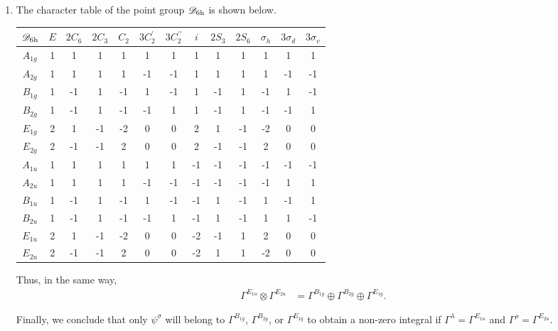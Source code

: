 \documentclass[a4paper]{book}
\begin{document}
\begin{solution}
\begin{enumerate}[label=(\alph*)]
		\item The character table of the point group $\mathscr{D}_{\rm 6h}$ is shown below.
		\begin{center}
		\begin{tabular}{ccccccccccccc}\hline
	$\mathscr{D}_{\rm 6h}$ & $E$ & $2C_6$ & $2C_3$ & $C_2$ & $3C^\prime_2 $ & $3C^{\prime\prime}_2$ & $i$ & $2S_3$ & $2S_6$ & $\sigma_h$ & $3\sigma_d$ & $3\sigma_v$ \\ \hline
			$A_{1g}$ & 1 & 1 & 1 & 1 & 1 & 1 & 1 & 1 & 1 & 1 & 1 & 1 \\
			$A_{2g}$ & 1 & 1 & 1 & 1 & -1 & -1 & 1 & 1 & 1 & 1 & -1 & -1 \\
			$B_{1g}$ & 1 & -1 & 1 & -1 & 1 & -1 & 1 & -1 & 1 & -1 & 1 & -1 \\
			$B_{2g}$ & 1 & -1 & 1 & -1 & -1 & 1 & 1 & -1 & 1 & -1 & -1 & 1 \\
			$E_{1g}$ & 2 & 1 & -1 & -2 & 0 & 0 & 2 & 1 & -1 & -2 & 0 & 0 \\
			$E_{2g}$ & 2 & -1 & -1 & 2 & 0 & 0 & 2 & -1 & -1 & 2 & 0 & 0 \\
			$A_{1u}$ & 1 & 1 & 1 & 1 & 1 & 1 & -1 & -1 & -1 & -1 & -1 & -1 \\
			$A_{2u}$ & 1 & 1 & 1 & 1 & -1 & -1 & -1 & -1 & -1 & -1 & 1 & 1 \\
			$B_{1u}$ & 1 & -1 & 1 & -1 & 1 & -1 & -1 & 1 & -1 & 1 & -1 & 1 \\
			$B_{2u}$ & 1 & -1 & 1 & -1 & -1 & 1 & -1 & 1 & -1 & 1 & 1 & -1 \\
			$E_{1u}$ & 2 & 1 & -1 & -2 & 0 & 0 & -2 & -1 & 1 & 2 & 0 & 0 \\
			$E_{2u}$ & 2 & -1 & -1 & 2 & 0 & 0 & -2 & 1 & 1 & -2 & 0 & 0 \\ \hline
		\end{tabular}
		\end{center}
		Thus, in the same way,
		\begin{align}
			\Gamma^{E_{1u}} \otimes \Gamma^{E_{2u}} &= \Gamma^{B_{1g}} \oplus \Gamma^{B_{2g}} \oplus \Gamma^{E_{1g}}.
		\end{align}
		
		Finally, we conclude that only $\psi^\sigma$ will belong to $\Gamma^{B_{1g}}$, $\Gamma^{B_{2g}}$, or $\Gamma^{E_{1g}}$ to obtain a non-zero integral if $\Gamma^\lambda = \Gamma^{E_{1u}}$ and $\Gamma^\rho = \Gamma^{E_{2u}}$.
		

\end{enumerate}
\end{solution}
\end{document}
